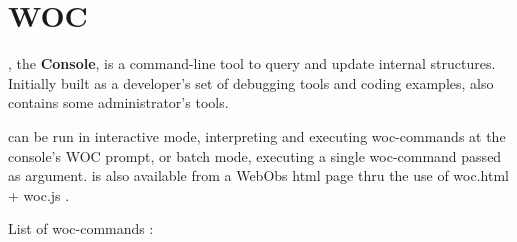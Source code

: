 \section{WOC}

, the \webobs \textbf{Console}, is a command-line tool to query and update internal \webobs structures.
Initially built as a developer's set of debugging tools and coding examples,  also contains some \webobs administrator's tools. 

 can be run in interactive mode, interpreting and executing woc-commands at the console's WOC prompt, or 
batch mode, executing a single woc-command passed as argument.  is also available from a WebObs html page 
thru the use of woc.html + woc.js .

List of woc-commands :


